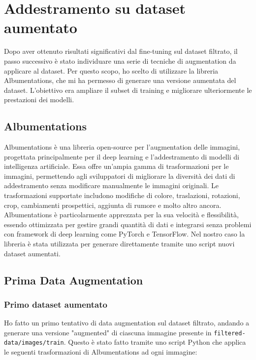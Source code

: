 \section{Addestramento su dataset aumentato}
Dopo aver ottenuto risultati significativi dal fine-tuning sul dataset filtrato, il passo successivo è stato individuare una serie di tecniche di augmentation da applicare al dataset. Per questo scopo, ho scelto di utilizzare la libreria Albumentations, che mi ha permesso di generare una versione aumentata del dataset. L'obiettivo era ampliare il subset di training e migliorare ulteriormente le prestazioni dei modelli.

\subsection{Albumentations}
Albumentations\cite{44} è una libreria open-source per l'augmentation delle immagini, progettata principalmente per il deep learning e l'addestramento di modelli di intelligenza artificiale. Essa offre un'ampia gamma di trasformazioni per le immagini, permettendo agli sviluppatori di migliorare la diversità dei dati di addestramento senza modificare manualmente le immagini originali. Le trasformazioni supportate includono modifiche di colore, traslazioni, rotazioni, crop, cambiamenti prospettici, aggiunta di rumore e molto altro ancora. Albumentations è particolarmente apprezzata per la sua velocità e flessibilità, essendo ottimizzata per gestire grandi quantità di dati e integrarsi senza problemi con framework di deep learning come PyTorch e TensorFlow. Nel nostro caso la libreria è stata utilizzata per generare direttamente tramite uno script nuovi dataset aumentati.

\newpage

\subsection{Prima Data Augmentation}

\subsubsection{Primo dataset aumentato}
Ho fatto un primo tentativo di data augmentation sul dataset filtrato, andando a generare una versione "augmented" di ciascuna immagine presente in \texttt{filtered-data/images/train}. Questo è stato fatto tramite uno script Python che applica le seguenti trasformazioni di Albumentations ad ogni immagine: 

